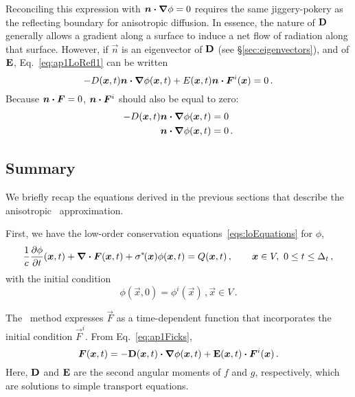Reconciling this expression with $\bm{n} \bm{\cdot} \bm{\nabla} \phi=0$ requires the same
jiggery-pokery as the reflecting boundary for anisotropic diffusion. In essence,
the nature of $\mathbf{D}$ generally allows a gradient along a surface to induce a
net flow of radiation along that surface. However, if $\vec{n}$ is an
eigenvector of $\mathbf{D}$ (see \S\ref{sec:eigenvectors}), and of $\mathbf{E}$,
Eq.~\eqref{eq:ap1LoRefl1} can be written
\begin{equation*}
  - D(\bm{x},t) \bm{n} \bm{\cdot} \bm{\nabla} \phi(\bm{x},t)
  + E(\bm{x},t) \bm{n} \bm{\cdot} \bm{F}^i(\bm{x}) = 0\,.
\end{equation*}
Because $\bm{n}\bm{\cdot}\bm{F}=0$, $\bm{n}\bm{\cdot}\bm{F}^i$ should also be equal to
zero:
\begin{align}\nonumber
  - D(\bm{x},t) \bm{n} \bm{\cdot} \bm{\nabla} \phi(\bm{x},t) &= 0  
  \\ \label{eq:ap1LoRefl2}
  \bm{n} \bm{\cdot} \bm{\nabla} \phi(\bm{x},t) &= 0\,.
\end{align}

\subsection{Summary}
We briefly recap the equations derived in the previous sections that describe
the anisotropic \Pone\ approximation.

First, we have the low-order conservation equations~\eqref{eqs:loEquations} for
$\phi$,
\begin{equation*}
  \frac{1}{c} \frac{\partial \phi}{\partial t} (\bm{x}, t)
  + \bm{\nabla} \bm{\cdot} \bm{F}(\bm{x},t)
  + \sigma^{*\!}(\bm{x}) \phi(\bm{x}, t)
  = Q(\bm{x}, t) \,,
  \qquad \bm{x} \in V,\ 0 \le t \le \Delta_t \,,
\end{equation*}
with the initial condition
\begin{equation*}
\phi(\vec{x}, 0) = \phi^i(\vec{x})\,, \vec{x} \in V  \,.
\end{equation*}

The \APone\ method expresses $\vec{F}$ as a time-dependent function that
incorporates the initial condition $\vec{F}^i$. From Eq.~\eqref{eq:ap1Ficks},
\begin{equation*}
  \bm{F}(\bm{x}, t)
= - \mathbf{D}(\bm{x},t) \bm{\cdot} \bm{\nabla} \phi(\bm{x},t)
  + \mathbf{E}(\bm{x},t) \bm{\cdot} \bm{F}^i(\bm{x})\,.
\end{equation*}
Here, $\mathbf{D}$ and $\mathbf{E}$ are the second angular moments of $f$ and $g$,
respectively, which are solutions to simple transport equations.

